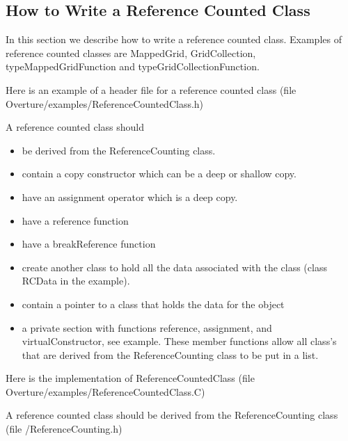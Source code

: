 \subsection{How to Write a Reference Counted Class}

In this section we describe how to write a reference
counted class. Examples of reference counted classes
are {\ff MappedGrid}, {\ff GridCollection}, 
{\ff typeMappedGridFunction} and {\ff typeGridCollectionFunction}.


Here is an example of a header file for a reference counted
class
(file {\ff Overture/examples/Reference\-Counted\-Class.h})
{\footnotesize
{}
}

A reference counted class should 
\begin{itemize}
 \item be derived from the {\ff ReferenceCounting} class.
 \item contain a copy constructor which can be a deep or shallow copy.
 \item have an assignment operator which is a deep copy.
 \item have a {\ff reference} function
 \item have a {\ff breakReference} function
 \item create another class to hold all the data associated with the class
       (class RCData in the example).
 \item contain a pointer to a class that holds the data for the object
 \item a private section with functions {\ff reference}, assignment,
       and {\ff virtualConstructor}, see example. These member functions
       allow all class's that are derived from the {\ff ReferenceCounting}
       class to be put in a list.
\end{itemize}

Here is the implementation of {\ff ReferenceCountedClass}
(file {\ff Overture/examples/Reference\-Counted\-Class.C})
{\footnotesize
{}
}



A reference counted class should be derived from the 
{\ff ReferenceCounting} class
(file {\ff /Reference\-Counting.h})
{\footnotesize
{}
}

